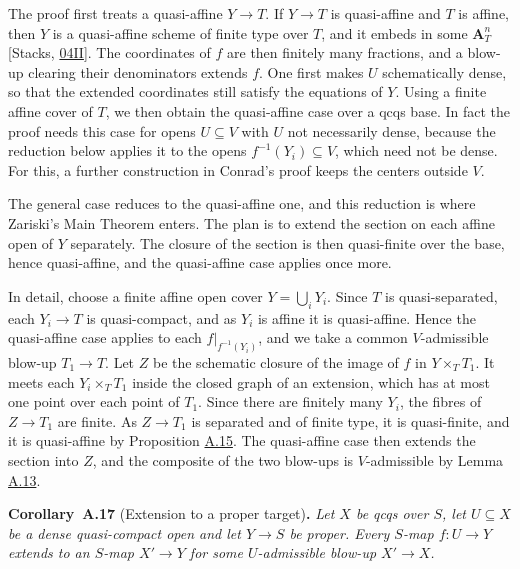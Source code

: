 \documentclass[11pt]{article}
\newenvironment{bpstatement}[2]{\par\addvspace{0.6\baselineskip}\noindent\textbf{#1}#2\textbf{.}\enspace\ignorespaces}
  {\par\addvspace{0.4\baselineskip}}
\newenvironment{bpstatementit}[2]{\begin{bpstatement}{#1}{#2}\itshape\ignorespaces}{\end{bpstatement}}
\begin{document}
The proof first treats a quasi-affine \(Y\to T\). If \(Y\to T\) is quasi-affine and \(T\) is affine, then \(Y\) is a quasi-affine scheme of finite type over \(T\), and it embeds in some \(\mathbf A^n_T\) [Stacks, \href{https://stacks.math.columbia.edu/tag/04II}{04II}]. The coordinates of \(f\) are then finitely many fractions, and a blow-up clearing their denominators extends \(f\). One first makes \(U\) schematically dense, so that the extended coordinates still satisfy the equations of \(Y\). Using a finite affine cover of \(T\), we then obtain the quasi-affine case over a qcqs base. In fact the proof needs this case for opens \(U\subseteq V\) with \(U\) not necessarily dense, because the reduction below applies it to the opens \(f^{-1}(Y_i)\subseteq V\), which need not be dense. For this, a further construction in Conrad's proof keeps the centers outside \(V\).

The general case reduces to the quasi-affine one, and this reduction is where Zariski's Main Theorem enters. The plan is to extend the section on each affine open of \(Y\) separately. The closure of the section is then quasi-finite over the base, hence quasi-affine, and the quasi-affine case applies once more.

In detail, choose a finite affine open cover \(Y=\bigcup_iY_i\). Since \(T\) is quasi-separated, each \(Y_i\to T\) is quasi-compact, and as \(Y_i\) is affine it is quasi-affine. Hence the quasi-affine case applies to each \(f|_{f^{-1}(Y_i)}\), and we take a common \(V\)-admissible blow-up \(T_1\to T\). Let \(Z\) be the schematic closure of the image of \(f\) in \(Y\times_TT_1\). It meets each \(Y_i\times_TT_1\) inside the closed graph of an extension, which has at most one point over each point of \(T_1\). Since there are finitely many \(Y_i\), the fibres of \(Z\to T_1\) are finite. As \(Z\to T_1\) is separated and of finite type, it is quasi-finite, and it is quasi-affine by Proposition \hyperref[bp38]{A.15}. The quasi-affine case then extends the section into \(Z\), and the composite of the two blow-ups is \(V\)-admissible by Lemma \hyperref[bp33]{A.13}.

\label{bp43}%
\begin{bpstatementit}{Corollary~A.17}{ (Extension to a proper target)}
Let \(X\) be qcqs over \(S\), let \(U\subseteq X\) be a dense quasi-compact open and let \(Y\to S\) be proper. Every \(S\)-map \(f:U\to Y\) extends to an \(S\)-map \(X'\to Y\) for some \(U\)-admissible blow-up \(X'\to X\).
\end{bpstatementit}
\end{document}
